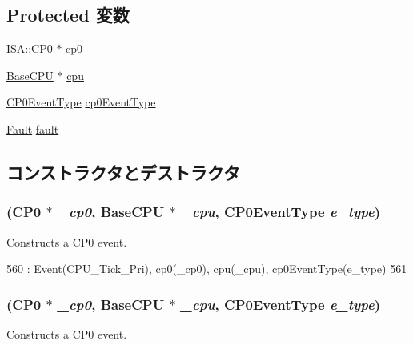 \subsection*{Protected 変数}
\begin{DoxyCompactItemize}
\item 
\hyperlink{classMipsISA_1_1ISA}{ISA::CP0} $\ast$ \hyperlink{classMipsISA_1_1ISA_1_1CP0Event_ae159fdf8262db4f0694422aa1d3c6d81}{cp0}
\item 
\hyperlink{classBaseCPU}{BaseCPU} $\ast$ \hyperlink{classMipsISA_1_1ISA_1_1CP0Event_add0eb5e06b5f70ce354db415a720abc4}{cpu}
\item 
\hyperlink{classMipsISA_1_1ISA_a7b22e0667d062181e0dcaa5cf0e66ba7}{CP0EventType} \hyperlink{classMipsISA_1_1ISA_1_1CP0Event_ac74bfe0d0d55cfd34a00200ffd9fe744}{cp0EventType}
\item 
\hyperlink{classRefCountingPtr}{Fault} \hyperlink{classMipsISA_1_1ISA_1_1CP0Event_a68714ceb74c60ea7ef5dec335bb6c5d7}{fault}
\end{DoxyCompactItemize}


\subsection{コンストラクタとデストラクタ}
\hypertarget{classMipsISA_1_1ISA_1_1CP0Event_a848116217afbda1fa62cd60e15a62549}{
\subsubsection[{CP0Event}]{ ({\bf CP0} $\ast$ {\em \_\-cp0}, \/  {\bf BaseCPU} $\ast$ {\em \_\-cpu}, \/  {\bf CP0EventType} {\em e\_\-type})}}
\label{classMipsISA_1_1ISA_1_1CP0Event_a848116217afbda1fa62cd60e15a62549}
Constructs a CP0 event. 


\begin{DoxyCode}
560     : Event(CPU_Tick_Pri), cp0(_cp0), cpu(_cpu), cp0EventType(e_type)
561 {  }
\end{DoxyCode}
\hypertarget{classMipsISA_1_1ISA_1_1CP0Event_a848116217afbda1fa62cd60e15a62549}{
\subsubsection[{CP0Event}]{ ({\bf CP0} $\ast$ {\em \_\-cp0}, \/  {\bf BaseCPU} $\ast$ {\em \_\-cpu}, \/  {\bf CP0EventType} {\em e\_\-type})}}
\label{classMipsISA_1_1ISA_1_1CP0Event_a848116217afbda1fa62cd60e15a62549}
Constructs a CP0 event. 

